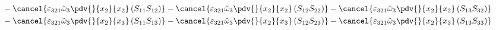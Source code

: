 \begin{equation}
\begin{split}
&		-\cancel{\varepsilon_{321}\tilde{\omega}_{3}\pdv{}{x_{2}}{x_{2}}\left(S_{11}S_{12}\right)}
		-\cancel{\varepsilon_{321}\tilde{\omega}_{3}\pdv{}{x_{2}}{x_{2}}\left(S_{12}S_{22}\right)}
		-\cancel{\varepsilon_{321}\tilde{\omega}_{3}\pdv{}{x_{2}}{x_{2}}\left(S_{13}S_{32}\right)}\\
&		-\cancel{\varepsilon_{321}\tilde{\omega}_{3}\pdv{}{x_{2}}{x_{3}}\left(S_{11}S_{13}\right)}
		-\cancel{\varepsilon_{321}\tilde{\omega}_{3}\pdv{}{x_{2}}{x_{3}}\left(S_{12}S_{23}\right)}
		-\cancel{\varepsilon_{321}\tilde{\omega}_{3}\pdv{}{x_{2}}{x_{3}}\left(S_{13}S_{33}\right)}\\
	\end{split}
\end{equation}
